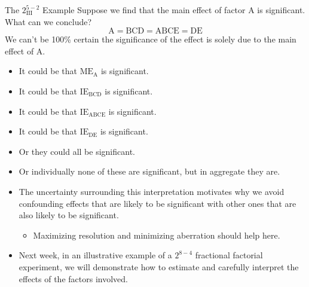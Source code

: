\begin{itemize}
\begin{Example}{The $ 2^{5-2}_{\text{III}} $ Example}{}
              Suppose we find that the main effect of factor A is significant. What can we conclude?
              \[ \text{A}=\text{BCD}=\text{ABCE}=\text{DE} \]
              We can't be 100\% certain the significance of the effect is solely due to the main effect of A.
              \begin{itemize}[\bullet]
                  \item It could be that $ \text{ME}_\text{A} $ is significant.
                  \item It could be that $ \text{IE}_\text{BCD} $ is significant.
                  \item It could be that $ \text{IE}_\text{ABCE} $ is significant.
                  \item It could be that $ \text{IE}_\text{DE} $ is significant.
                  \item Or they could all be significant.
                  \item Or individually none of these are significant, but in aggregate they are.
              \end{itemize}
          \end{Example}
\end{itemize}
\begin{itemize}[*]
    \item The uncertainty surrounding this interpretation motivates why we avoid confounding effects that are
          likely to be significant with other ones that are also likely to be significant.
          \begin{itemize}[$\hookrightarrow$]
              \item Maximizing resolution and minimizing aberration should help here.
          \end{itemize}
    \item Next week, in an illustrative example of a $ 2^{8-4} $ fractional factorial experiment, we will demonstrate
          how to estimate and carefully interpret the effects of the factors involved.
\end{itemize}
